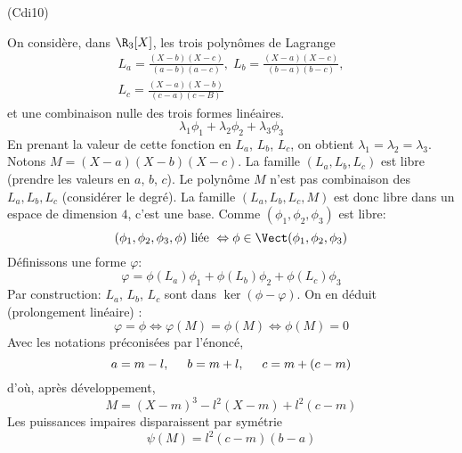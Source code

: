 \begin{tiny}(Cdi10)\end{tiny} On considère, dans $\R_3[X]$, les trois polynômes de Lagrange 
\begin{multline*}
 L_a = \frac{(X-b)(X-c)}{(a-b)(a-c)},\;
 L_b = \frac{(X-a)(X-c)}{(b-a)(b-c)}, \\
 L_c = \frac{(X-a)(X-b)}{(c-a)(c-B)} 
\end{multline*}
et une combinaison nulle des trois formes linéaires.
\begin{displaymath}
 \lambda_1\phi_1 + \lambda_2 \phi_2 + \lambda_3 \phi_3
\end{displaymath}
En prenant la valeur de cette fonction en $L_a$, $L_b$, $L_c$, on obtient
$\lambda_1 = \lambda_2 = \lambda_3$.\newline
Notons $M=(X-a)(X-b)(X-c)$. La famille $(L_a,L_b,L_c)$ est libre (prendre les valeurs en $a$, $b$, $c$). Le polynôme $M$ n'est pas combinaison des $L_a, L_b, L_c$ (considérer le degré). La famille $(L_a,L_b,L_c,M)$ est donc libre dans un espace de dimension $4$, c'est une base.\newline
Comme $(\phi_1,\phi_2,\phi_3)$ est libre:
\begin{displaymath}
  (\phi_1,\phi_2,\phi_3,\phi)\text{ liée } \Leftrightarrow \phi\in \Vect(\phi_1,\phi_2,\phi_3)
\end{displaymath}
Définissons une forme $\varphi$:
\begin{displaymath}
 \varphi = \phi(L_a)\phi_1 + \phi(L_b)\phi_2 + \phi(L_c)\phi_3 
\end{displaymath}
Par construction: $L_a$, $L_b$, $L_c$ sont dans $\ker(\phi - \varphi)$. On en déduit (prolongement linéaire) :
\begin{displaymath}
 \varphi = \phi \Leftrightarrow \varphi(M)=\phi(M) \Leftrightarrow \phi(M) = 0
\end{displaymath}
Avec les notations préconisées par l'énoncé,
\begin{displaymath}
 a=m-l,\hspace{0.5cm} b=m+l,\hspace{0.5cm} c = m + (c-m)
\end{displaymath}
d'où, après développement,
\begin{displaymath}
 M = (X-m)^3 -l^2(X-m) + l^2(c-m)
\end{displaymath}
Les puissances impaires disparaissent par symétrie
\begin{displaymath}
 \psi(M) = l^2(c-m)(b-a)
\end{displaymath}

